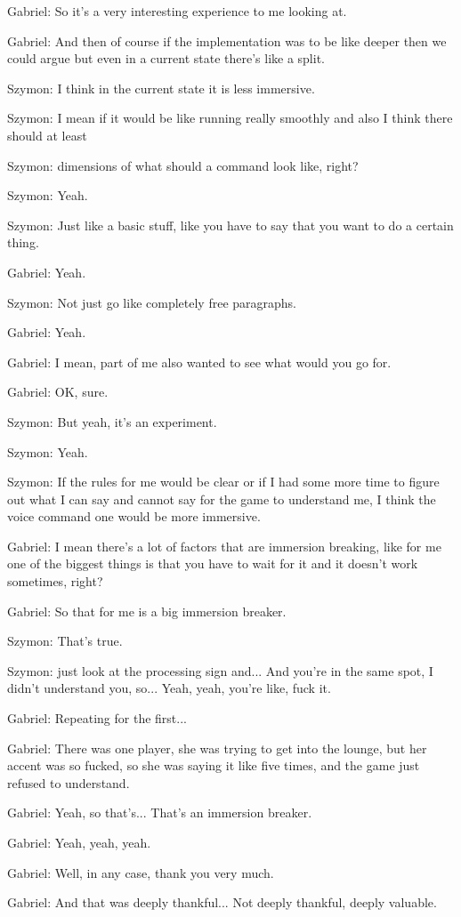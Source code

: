 Gabriel: So it's a very interesting experience to me looking at.

Gabriel: And then of course if the implementation was to be like deeper then we could argue but even in a current state there's like a split.

Szymon: I think in the current state it is less immersive.

Szymon: I mean if it would be like running really smoothly and also I think there should at least

Szymon: dimensions of what should a command look like, right?

Szymon: Yeah.

Szymon: Just like a basic stuff, like you have to say that you want to do a certain thing.

Gabriel: Yeah.

Szymon: Not just go like completely free paragraphs.

Gabriel: Yeah.

Gabriel: I mean, part of me also wanted to see what would you go for.

Gabriel: OK, sure.

Szymon: But yeah, it's an experiment.

Szymon: Yeah.

Szymon: If the rules for me would be clear or if I had some more time to figure out what I can say and cannot say for the game to understand me, I think the voice command one would be more immersive.

Gabriel: I mean there's a lot of factors that are immersion breaking, like for me one of the biggest things is that you have to wait for it and it doesn't work sometimes, right?

Gabriel: So that for me is a big immersion breaker.

Szymon: That's true.

Szymon: just look at the processing sign and... And you're in the same spot, I didn't understand you, so... Yeah, yeah, you're like, fuck it.

Gabriel: Repeating for the first...

Gabriel: There was one player, she was trying to get into the lounge, but her accent was so fucked, so she was saying it like five times, and the game just refused to understand.

Gabriel: Yeah, so that's... That's an immersion breaker.

Gabriel: Yeah, yeah, yeah.

Gabriel: Well, in any case, thank you very much.

Gabriel: And that was deeply thankful... Not deeply thankful, deeply valuable.